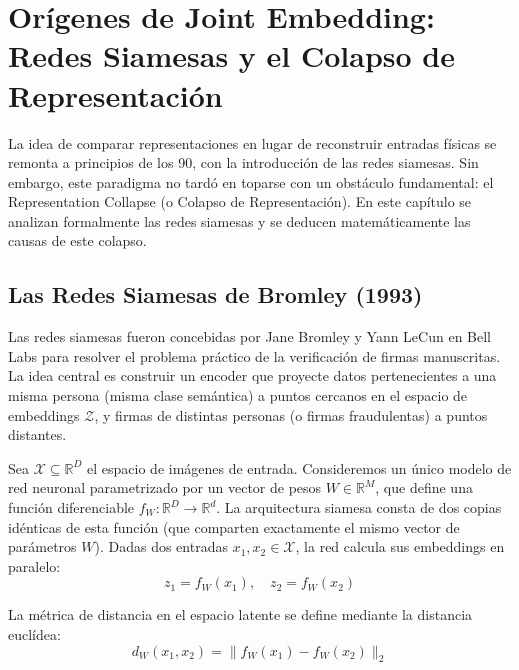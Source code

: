 \chapter{Orígenes de Joint Embedding: Redes Siamesas y el Colapso de Representación}
\label{cap:siamesas_colapso}

La idea de comparar representaciones en lugar de reconstruir entradas físicas se remonta a principios de los 90, con la introducción de las redes siamesas. Sin embargo, este paradigma no tardó en toparse con un obstáculo fundamental: el Representation Collapse (o Colapso de Representación). En este capítulo se analizan formalmente las redes siamesas y se deducen matemáticamente las causas de este colapso.

\section{Las Redes Siamesas de Bromley (1993)}
\label{sec:siamesas_bromley}

Las redes siamesas fueron concebidas por Jane Bromley y Yann LeCun en Bell Labs \cite{bromley1993signature} para resolver el problema práctico de la verificación de firmas manuscritas. La idea central es construir un encoder que proyecte datos pertenecientes a una misma persona (misma clase semántica) a puntos cercanos en el espacio de embeddings $\mathcal{Z}$, y firmas de distintas personas (o firmas fraudulentas) a puntos distantes.

\begin{definition}
Sea $\mathcal{X} \subseteq \mathbb{R}^D$ el espacio de imágenes de entrada. Consideremos un único modelo de red neuronal parametrizado por un vector de pesos $W \in \mathbb{R}^M$, que define una función diferenciable $f_W: \mathbb{R}^D \to \mathbb{R}^d$. 
La arquitectura siamesa consta de dos copias idénticas de esta función (que comparten exactamente el mismo vector de parámetros $W$). Dadas dos entradas $x_1, x_2 \in \mathcal{X}$, la red calcula sus embeddings en paralelo:
\begin{equation}
z_1 = f_W(x_1), \quad z_2 = f_W(x_2)
\end{equation}

La métrica de distancia en el espacio latente se define mediante la distancia euclídea:
\begin{equation}
d_W(x_1, x_2) = \| f_W(x_1) - f_W(x_2) \|_2
\end{equation}
\end{definition}

